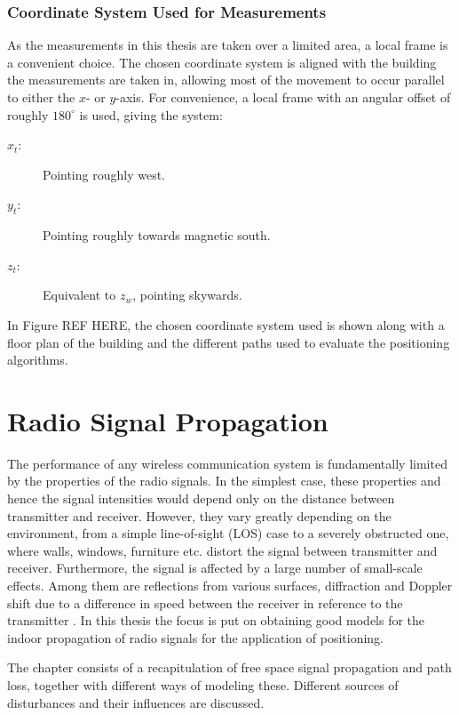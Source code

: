 \documentclass{LTHthesis}
\begin{document}
\subsection{Coordinate System Used for Measurements}
%
%
As the measurements in this thesis are taken over a limited area, a local frame is a convenient choice. The chosen coordinate system is aligned with the building the measurements are taken in, allowing most of the movement to occur parallel to either the $x$- or $y$-axis. For convenience, a local frame with an angular offset of roughly $180^\circ$ is used, giving the system:
%
\begin{description}
\item[$x_t$:] Pointing roughly west. 
\item[$y_t$:] Pointing roughly towards magnetic south.
\item[$z_t$:] Equivalent to $z_w$, pointing skywards.
\end{description}
%
In Figure REF HERE, the chosen coordinate system used is shown along with a floor plan of the building and the different paths used to evaluate the positioning algorithms.
%
\chapter{Radio Signal Propagation}
%
\label{chap:RSP}
%
The performance of any wireless communication system is fundamentally limited by the properties of the radio signals. In the simplest case, these properties and hence the signal intensities would depend only on the distance between transmitter and receiver. However, they vary greatly depending on the environment, from a simple line-of-sight (LOS) case to a severely obstructed one, where walls, windows, furniture etc. distort the signal between transmitter and receiver. Furthermore, the signal is affected by a large number of small-scale effects. Among them are reflections from various surfaces, diffraction and Doppler shift due to a difference in speed between the receiver in reference to the transmitter \cite{rappaport96}. In this thesis the focus is put on obtaining good models for the indoor propagation of radio signals for the application of positioning. 

The chapter consists of a recapitulation of free space signal propagation and path loss, together with different ways of modeling these. Different sources of disturbances and their influences are discussed.
%
\end{document}
